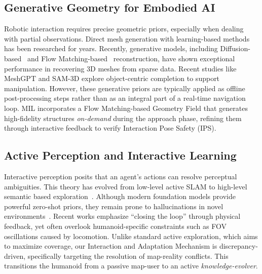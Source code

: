 \documentclass[conference]{IEEEtran}
\begin{document}
\subsection{Generative Geometry for Embodied AI}
Robotic interaction requires precise geometric priors, especially when dealing with partial observations. Direct mesh generation with learning-based methods~\cite{chen2020bsp, dai2019scan2mesh, groueix2018papier, nash2020polygen} has been researched for years. Recently, generative models, including Diffusion-based~\cite{ho2020denoising} and Flow Matching-based~\cite{lipman2023flow} reconstruction, have shown exceptional performance in recovering 3D meshes from sparse data. Recent studies like MeshGPT \cite{siddiqui2024meshgpt} and SAM-3D \cite{chen2025sam} explore object-centric completion to support manipulation. However, these generative priors are typically applied as offline post-processing steps rather than as an integral part of a real-time navigation loop. MIL incorporates a Flow Matching-based Geometry Field that generates high-fidelity structures \textit{on-demand} during the approach phase, refining them through interactive feedback to verify Interaction Pose Safety (IPS).

\subsection{Active Perception and Interactive Learning}
Interactive perception \cite{bohg2017interactive} posits that an agent's actions can resolve perceptual ambiguities. This theory has evolved from low-level active SLAM \cite{bajcsy1988active, zhao2022perception, xu2021invariant, kim2013perception, chaplot2020learning} to high-level semantic based exploration~\cite{yokoyama2024vlfm, zhu2025move, chen2023not, chaplot2020object}. Although modern foundation models provide powerful zero-shot priors, they remain prone to hallucinations in novel environments~\cite{chang2024goat, chen2023not}. Recent works emphasize ``closing the loop'' through physical feedback, yet often overlook humanoid-specific constraints such as FOV oscillations caused by locomotion. Unlike standard active exploration, which aims to maximize coverage, our Interaction and Adaptation Mechanism is discrepancy-driven, specifically targeting the resolution of map-reality conflicts. This transitions the humanoid from a passive map-user to an active \textit{knowledge-evolver}.
\end{document}
